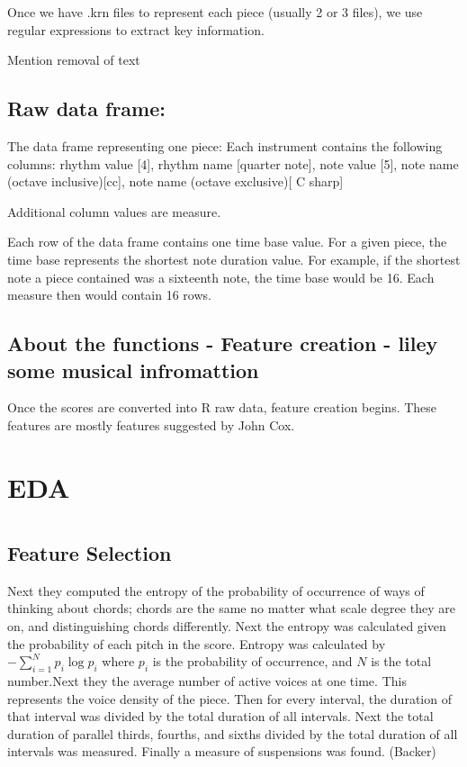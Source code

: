 \documentclass[12pt,twoside]{reedthesis}
\theoremstyle{definition}
\theoremstyle{definition}
\theoremstyle{definition}
\theoremstyle{remark}
\begin{document}
Once we have .krn files to represent each piece (usually 2 or 3 files),
we use regular expressions to extract key information.

Mention removal of text

\section{Raw data frame:}\label{raw-data-frame}

The data frame representing one piece: Each instrument contains the
following columns: rhythm value {[}4{]}, rhythm name {[}quarter note{]},
note value {[}5{]}, note name (octave inclusive){[}cc{]}, note name
(octave exclusive){[} C sharp{]}

Additional column values are measure.

Each row of the data frame contains one time base value. For a given
piece, the time base represents the shortest note duration value. For
example, if the shortest note a piece contained was a sixteenth note,
the time base would be 16. Each measure then would contain 16 rows.

\section{About the functions - Feature creation - liley some musical
infromattion}\label{about-the-functions---feature-creation---liley-some-musical-infromattion}

Once the scores are converted into R raw data, feature creation begins.
These features are mostly features suggested by John Cox.

\chapter{EDA}\label{eda}

\chapter{}\label{section-2}

\section{Feature Selection}\label{feature-selection-1}

Next they computed the entropy of the probability of occurrence of ways
of thinking about chords; chords are the same no matter what scale
degree they are on, and distinguishing chords differently. Next the
entropy was calculated given the probability of each pitch in the score.
Entropy was calculated by \(-\sum_{i = 1}^{N}p_i\log{p_i}\) where
\(p_i\) is the probability of occurrence, and \(N\) is the total
number.Next they the average number of active voices at one time. This
represents the voice density of the piece. Then for every interval, the
duration of that interval was divided by the total duration of all
intervals. Next the total duration of parallel thirds, fourths, and
sixths divided by the total duration of all intervals was measured.
Finally a measure of suspensions was found. (Backer)
\end{document}
